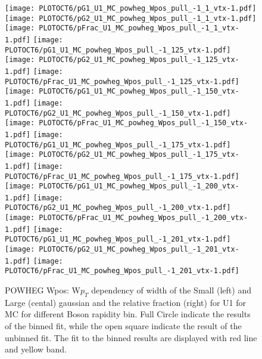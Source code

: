 \documentclass[41pt,a4paper,oneside]{report}
\begin{document}
\begin{figure}[h!]
  \begin{center}
    \texttt{[image: PLOTOCT6/pG1\_U1\_MC\_powheg\_Wpos\_pull\_-1\_1\_vtx-1.pdf]}
    \texttt{[image: PLOTOCT6/pG2\_U1\_MC\_powheg\_Wpos\_pull\_-1\_1\_vtx-1.pdf]}
    \texttt{[image: PLOTOCT6/pFrac\_U1\_MC\_powheg\_Wpos\_pull\_-1\_1\_vtx-1.pdf]} 
    \texttt{[image: PLOTOCT6/pG1\_U1\_MC\_powheg\_Wpos\_pull\_-1\_125\_vtx-1.pdf]}
    \texttt{[image: PLOTOCT6/pG2\_U1\_MC\_powheg\_Wpos\_pull\_-1\_125\_vtx-1.pdf]}
    \texttt{[image: PLOTOCT6/pFrac\_U1\_MC\_powheg\_Wpos\_pull\_-1\_125\_vtx-1.pdf]} 
    \texttt{[image: PLOTOCT6/pG1\_U1\_MC\_powheg\_Wpos\_pull\_-1\_150\_vtx-1.pdf]}
    \texttt{[image: PLOTOCT6/pG2\_U1\_MC\_powheg\_Wpos\_pull\_-1\_150\_vtx-1.pdf]}
    \texttt{[image: PLOTOCT6/pFrac\_U1\_MC\_powheg\_Wpos\_pull\_-1\_150\_vtx-1.pdf]} 
    \texttt{[image: PLOTOCT6/pG1\_U1\_MC\_powheg\_Wpos\_pull\_-1\_175\_vtx-1.pdf]}
    \texttt{[image: PLOTOCT6/pG2\_U1\_MC\_powheg\_Wpos\_pull\_-1\_175\_vtx-1.pdf]}
    \texttt{[image: PLOTOCT6/pFrac\_U1\_MC\_powheg\_Wpos\_pull\_-1\_175\_vtx-1.pdf]} 
    \texttt{[image: PLOTOCT6/pG1\_U1\_MC\_powheg\_Wpos\_pull\_-1\_200\_vtx-1.pdf]}
    \texttt{[image: PLOTOCT6/pG2\_U1\_MC\_powheg\_Wpos\_pull\_-1\_200\_vtx-1.pdf]}
    \texttt{[image: PLOTOCT6/pFrac\_U1\_MC\_powheg\_Wpos\_pull\_-1\_200\_vtx-1.pdf]} 
    \texttt{[image: PLOTOCT6/pG1\_U1\_MC\_powheg\_Wpos\_pull\_-1\_201\_vtx-1.pdf]}
    \texttt{[image: PLOTOCT6/pG2\_U1\_MC\_powheg\_Wpos\_pull\_-1\_201\_vtx-1.pdf]}
    \texttt{[image: PLOTOCT6/pFrac\_U1\_MC\_powheg\_Wpos\_pull\_-1\_201\_vtx-1.pdf]} 
    \caption{POWHEG Wpos: W$p_{T}$ dependency of width of the Small (left) and Large (cental) gaussian and the relative fraction (right) for U1 for MC for different Boson rapidity bin. Full Circle indicate the results of the binned fit, while the open square indicate the result of the unbinned fit. The fit to the binned results are displayed with red line and yellow band. {\color{blue}{plot oder than OCT6}}
\newline
}
    \label{fig:SmallLargeU1POWpos}
  \end{center}
\end{figure}
\end{document}
